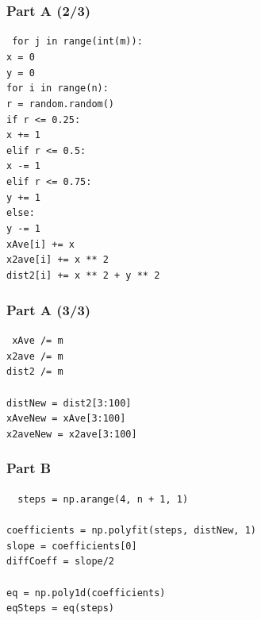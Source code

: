 \documentclass[mathserif,18pt,xcolor=table]{beamer}
\begin{document}
\begin{frame}
	\frametitle{Part A (2/3)}
	{
	\tt
	\qquad for j in range(int(m)):   	\\
    \qquad \qquad x = 0               	\\        
    \qquad \qquad y = 0               	\\    
    \qquad \qquad for i in range(n):    	 	\\
    \qquad \qquad \qquad r = random.random() 	\\
    \qquad \qquad \qquad if r <= 0.25:       	\\
    \qquad \qquad \qquad\qquad x += 1     		\\
    \qquad \qquad \qquad elif r <= 0.5:		 	\\
    \qquad \qquad \qquad\qquad x -= 1			\\
    \qquad \qquad \qquad elif r <= 0.75:		\\
    \qquad \qquad \qquad\qquad y += 1	 		\\
    \qquad \qquad \qquad else:				 	\\
    \qquad \qquad \qquad \qquad y -= 1			\\
    \qquad \qquad \qquad xAve[i] += x   		\\                         
    \qquad \qquad \qquad x2ave[i] += x ** 2    \\
    \qquad \qquad \qquad dist2[i] += x ** 2 + y ** 2
	}
\end{frame}

\begin{frame}
	\frametitle{Part A (3/3)}
	{
	\tt
	\qquad xAve /= m  				\\
    \qquad x2ave /= m               	\\        
    \qquad dist2 /= m               	\\
	~\\    
    \qquad distNew = dist2[3:100]   \\                     
	\qquad xAveNew = xAve[3:100]  	\\                      
	\qquad x2aveNew = x2ave[3:100]  \\                
	}	
\end{frame}

\begin{frame}
	\frametitle{Part B}
	\tt
	{
	\qquad steps = np.arange(4, n + 1, 1)    \\               
	~\\
	\qquad coefficients = np.polyfit(steps, distNew, 1)   \\
	\qquad slope = coefficients[0]           \\          
	\qquad diffCoeff = slope/2                          	\\
  	~\\
	\qquad eq = np.poly1d(coefficients) \\          
	\qquad eqSteps = eq(steps)    \\                
	}
\end{frame}
\end{document}
